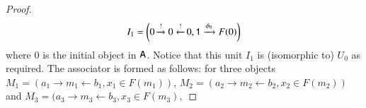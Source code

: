 \documentclass[reqno]{amsart}
\begin{document}
\begin{proof}
\begin{comment}
\[
\begin{tikzpicture}[scale=1.5]
\node (A) at (0,0) {$a_1$};
\node (B) at (1,0) {$m_1$};
\node (C) at (2,0) {$b_1$};
\node (D) at (1,-0.5) {$x_1 \in F(m_1)$};
\node (E) at (3,0) {$a_2$};
\node (F) at (4,0) {$m_2$};
\node (G) at (5,0) {$b_2$};
\node (H) at (4,-0.5) {$x_2 \in F(m_2)$};
\path[->,font=\scriptsize,>=angle 90]
(A) edge node[above]{$i_1$} (B)
(C) edge node[above]{$o_1$} (B)
(E) edge node[above]{$i_2$} (F)
(G) edge node[above]{$o_2$} (F);
\end{tikzpicture}
\]
their tensor product $M_1 \otimes M_2$ is given by taking the coproducts of the cospans in $\A$
\[
\begin{tikzpicture}[scale=1.5]
\node (A) at (0,0) {$a_1+a_2$};
\node (B) at (1.5,0) {$m_1+m_2$};
\node (C) at (3,0) {$b_1+b_2$};
\node (D) at (4.55,0) {$x_1+x_2 \in F(m_1+m_2)$};
\path[->,font=\scriptsize,>=angle 90]
(A) edge node[above]{$i_1+i_2$} (B)
(C) edge node[above]{$o_1+o_2$} (B);
\end{tikzpicture}
\]
where the decoration on the apex is obtained using the natural transformation of the symmetric lax monoidal pseudofunctor $F$: $$x_1+x_2 \mapseqq 1 \xrightarrow{\lambda^{-1}} 1 \times 1 \xrightarrow{x_1 \times x_2} F(m_1) \times F(m_2) \xrightarrow{\phi_{m_1,m_2}} F(m_1+m_2).$$
The monoidal unit $0_{F\lCsp_1}$ is given by:
\[
\begin{tikzpicture}[scale=1.5]
\node (A) at (0,0) {$0$};
\node (B) at (1,0) {$0$};
\node (C) at (2,0) {$0,$};
\node (D) at (3,0) {\bot_0 = \phi \in F(0)$};
\path[->,font=\scriptsize,>=angle 90]
(A) edge node[above]{$!$} (B)
(C) edge node[above]{$!$} (B);
\end{tikzpicture}
\]
\end{comment}
\begin{equation}\label{eq:monoidalunitFCsp}
I_1=\left(0\xrightarrow{!}0\xleftarrow{!}0, \mathsf{1} \xrightarrow{\phi_0}F(0)\right)
\end{equation}
where $0$ is the initial object in $\mathsf{A}$. Notice that this unit $I_1$ is (isomorphic to) $U_0$ as required. The associator is formed as follows: for three objects
$M_1=(a_1\to m_1\leftarrow b_1,x_1\in F(m_1))$, $M_2=(a_2\to m_2\leftarrow b_2,x_2\in F(m_2))$ and $M_3=(a_3\to m_3\leftarrow b_3,x_3\in F(m_3),$

\end{proof}
\end{document}
